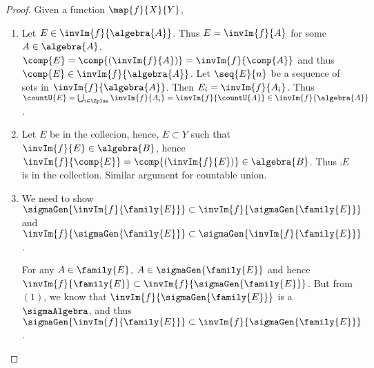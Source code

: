 \begin{proof}
    Given a function $\map{f}{X}{Y}$, 
    \begin{enumerate}
	\item Let $E \in \invIm{f}{\algebra{A}}$. Thus $E = \invIm{f}{A}$ for some $A \in
	    \algebra{A}$. $\comp{E} = \comp{(\invIm{f}{A})} = \invIm{f}{\comp{A}}$ and 
	    thus $\comp{E}\in\invIm{f}{\algebra{A}}$. Let $\seq{E}{n}$ be a sequence of sets in
	    $\invIm{f}{\algebra{A}}$. Then $E_i = \invIm{f}{A_i}$. Thus $\countU{E} =
	    \bigcup_{i\in\Zplus}\invIm{f}{A_i} = \invIm{f}{\countU{A}} \in \invIm{f}{\algebra{A}}$.
	\item Let $E$ be in the collecion, hence, $E \subset Y$ such that $\invIm{f}{E} \in 
	    \algebra{B}$, hence $\invIm{f}{\comp{E}} = \comp{(\invIm{f}{E})} \in \algebra{B}$. 
	    Thus $\comp{E}$ is in the collection. Similar argument for countable union.
	\item
	    We need to show $\sigmaGen{\invIm{f}{\family{E}}} \subset 
	    \invIm{f}{\sigmaGen{\family{E}}}$ and $ \invIm{f}{\sigmaGen{\family{E}}} \subset 
	    \sigmaGen{\invIm{f}{\family{E}}}$.
	    
	    For any $A \in \family{E}$, $A \in \sigmaGen{\family{E}}$ and hence
	    $\invIm{f}{\family{E}} \subset \invIm{f}{\sigmaGen{\family{E}}}$. But from
	    $(1)$, we know that $\invIm{f}{\sigmaGen{\family{E}}}$ is a $\sigmaAlgebra$, and
	    thus $\sigmaGen{\invIm{f}{\family{E}}} \subset
	    \invIm{f}{\sigmaGen{\family{E}}}$.


\end{enumerate}
\end{proof}
